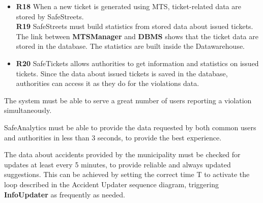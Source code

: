 \documentclass[./main.tex]{subfiles}
\begin{document}

\begin{itemize}
\item
  \textbf{R18} When a new ticket is generated using MTS, ticket-related
  data are stored by SafeStreets.\\
  \textbf{R19} SafeStreets must build statistics from stored data about
  issued tickets.
  \subitem
    The link between \textbf{MTSManager} and \textbf{DBMS} shows that the ticket data are stored in the database. The statistics are built inside the Datawarehouse.

\item
  \textbf{R20} SafeTickets allows authorities to get information and
  statistics on issued tickets.
  \subitem
    Since the data about issued tickets is saved in the database, authorities can access it as they do for the violations data.
\end{itemize}


\item
  The system must be able to serve a great number of users reporting a
  violation simultaneously.
  \subitem
\item
  SafeAnalytics must be able to provide the data requested by both
  common users and authorities in less than 3 seconds, to provide the
  best experience.
  \subitem 
\item
  The data about accidents provided by the municipality must be checked
  for updates at least every 5 minutes, to provide reliable and always
  updated suggestions.
  \subitem
    This can be achieved by setting the correct time T to activate the loop described in the Accident Updater sequence diagram, triggering \textbf{InfoUpdater} as frequently as needed.
\end{document}
